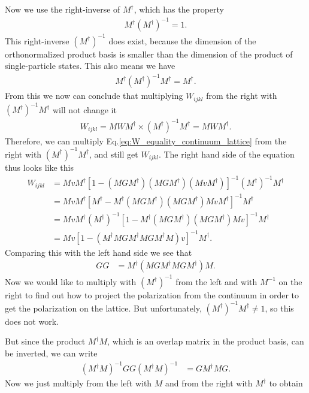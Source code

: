 \documentclass[12pt,a4paper]{scrartcl}
\numberwithin{equation}{section}
\begin{document}
Now we use the right-inverse of $M^{\dagger}$, which has the property
\begin{align}
 M^{\dagger} (M^{\dagger})^{-1} = 1.
\end{align}
This right-inverse $(M^{\dagger})^{-1}$ does exist, because the dimension of the orthonormalized
product basis is smaller than the dimension of the product of single-particle states.
This also means we have
\begin{align}
 M^{\dagger} (M^{\dagger})^{-1}  M^{\dagger}= M^{\dagger}.
\end{align}
From this we now can conclude that multiplying $W_{ijkl}$ from the right with $(M^{\dagger})^{-1}  M^{\dagger}$
will not change it
\begin{align}
 W_{ijkl} = M W M^{\dagger} \times (M^{\dagger})^{-1}  M^{\dagger} = M W M^{\dagger}.
\end{align}
Therefore, we can multiply Eq.\eqref{eq:W_equality_continuum_lattice} from the right 
with $(M^{\dagger})^{-1}  M^{\dagger}$, and still get $W_{ijkl}$. 
The right hand side of the equation thus looks like this
\begin{align}
 W_{ijkl} 
 &= M v M^{\dagger} [ 1 - (M G M^{\dagger}) (M G M^{\dagger}) (M v M^{\dagger}) ]^{-1} (M^{\dagger})^{-1}  M^{\dagger} \\
 &= M v M^{\dagger} [ M^{\dagger} - M^{\dagger} (M G M^{\dagger}) (M G M^{\dagger}) M v M^{\dagger} ]^{-1}   M^{\dagger} \\
 &= M v M^{\dagger}  (M^{\dagger})^{-1} [ 1 - M^{\dagger}(M G M^{\dagger}) (M G M^{\dagger} ) M v  ]^{-1}   M^{\dagger} \\
 &= M v  [ 1 - (M^{\dagger}M G M^{\dagger} M G M^{\dagger} M) v  ]^{-1}   M^{\dagger} .
\end{align}
Comparing this with the left hand side we see that
\begin{align}
 GG &=M^{\dagger} ( M G M^{\dagger} M G M^{\dagger} ) M.
\end{align}
Now we would like to multiply with $(M^{\dagger} )^{-1}$ from the left
and with $M^{-1}$ on the right to find out how to project the polarization from the continuum in order
to get the polarization on the lattice.
But unfortunately, $(M^{\dagger} )^{-1} M^{\dagger} \neq 1$, so this does not work.

But since the product $M^{\dagger}  M$, which is an overlap matrix in the product basis, can be inverted, 
we can write
\begin{align}
 ( M^{\dagger} M )^{-1} GG ( M^{\dagger} M )^{-1} &=  G M^{\dagger} M G .
\end{align}
Now we just multiply from the left with $M$ and from the right with $M^{\dagger}$ to obtain
\end{document}
